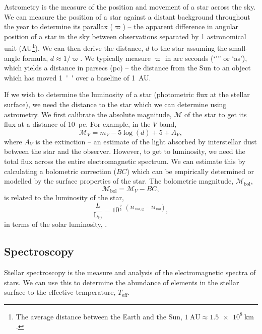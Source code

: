 Astrometry is the measure of the position and movement of a star across the sky. We can measure the position of a star against a distant background throughout the year to determine its parallax ($\varpi$) -- the apparent difference in angular position of a star in the sky between observations separated by 1 astronomical unit (AU\footnote{The average distance between the Earth and the Sun, $\SI{1}{\mathrm{AU}} \approx \SI{1.5e8}{\kilo\meter}$.}). We can then derive the distance, $d$ to the star assuming the small-angle formula, $d \approx 1/\varpi$. We typically measure $\varpi$ in arc seconds (`''' or `as'), which yields a distance in parsecs (pc) -- the distance from the Sun to an object which has moved \SI{1}{''} over a baseline of \SI{1}{AU}.

If we wish to determine the luminosity of a star (photometric flux at the stellar surface), we need the distance to the star which we can determine using astrometry. We first calibrate the absolute magnitude, $\mathcal{M}$ of the star to get its flux at a distance of \SI{10}{pc}. For example, in the $V$-band,
\begin{equation}
    \mathcal{M}_V = m_V - 5 \log(d) + 5 + A_V,
\end{equation}
where $A_V$ is the extinction -- an estimate of the light absorbed by interstellar dust between the star and the observer. However, to get to luminosity, we need the total flux across the entire electromagnetic spectrum. We can estimate this by calculating a bolometric correction ($BC$) which can be empirically determined or modelled by the surface properties of the star. The bolometric magnitude, $\mathcal{M}_\mathrm{bol}$,
\begin{equation}
    \mathcal{M}_\mathrm{bol} = \mathcal{M}_V - BC,
\end{equation}
is related to the luminosity of the star,
\begin{equation}
    \frac{L}{\mathrm{L}_{\odot}}=10^{\frac{2}{5}\cdot\left(\mathcal{M}_{\mathrm{bol}, \odot}-\mathcal{M}_{\mathrm{bol}}\right)},
\end{equation}
in terms of the solar luminosity, \si{\solarluminosity}.

\subsection{Spectroscopy}

Stellar spectroscopy is the measure and analysis of the electromagnetic spectra of stars. We can use this to determine the abundance of elements in the stellar surface to the effective temperature, $T_\mathrm{eff}$.

